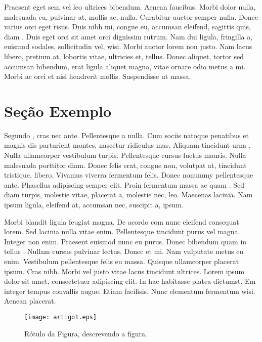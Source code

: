 Praesent eget sem vel leo ultrices bibendum. Aenean faucibus. Morbi dolor nulla, malesuada eu, pulvinar at, mollis ac, nulla. Curabitur auctor semper nulla. Donec varius orci eget risus. Duis nibh mi, congue eu, accumsan eleifend, sagittis quis, diam \citep{Justel2014}. Duis eget orci sit amet orci dignissim rutrum. Nam dui ligula, fringilla a, euismod sodales, sollicitudin vel, wisi. Morbi auctor lorem non justo. Nam lacus libero, pretium at, lobortis vitae, ultricies et, tellus. Donec aliquet, tortor sed accumsan bibendum, erat ligula aliquet magna, vitae ornare odio metus a mi. Morbi ac orci et nisl hendrerit mollis. Suspendisse ut massa.

\section{Seção Exemplo}
Segundo \citet{Goldschmidt2005}, cras nec ante. Pellentesque a nulla. Cum sociis natoque penatibus et magnis dis parturient montes, nascetur ridiculus mus. Aliquam tincidunt urna \citep{Rakocevic2014}. Nulla ullamcorper vestibulum turpis. Pellentesque cursus luctus mauris. Nulla malesuada porttitor diam. Donec felis erat, congue non, volutpat at, tincidunt tristique, libero. Vivamus viverra fermentum felis. Donec nonummy pellentesque ante. Phasellus adipiscing semper elit. Proin fermentum massa ac quam \citep{Lara2014}. Sed diam turpis, molestie vitae, placerat a, molestie nec, leo. Maecenas lacinia. Nam ipsum ligula, eleifend at, accumsan nec, suscipit a, ipsum.

Morbi blandit ligula feugiat magna. De acordo com  \citet{Soares2013} nunc eleifend consequat lorem. Sed lacinia nulla vitae enim. Pellentesque tincidunt purus vel magna. Integer non enim. Praesent euismod nunc eu purus. Donec bibendum quam in tellus \citep{Yoko2003}. Nullam cursus pulvinar lectus. Donec et mi. Nam vulputate metus eu enim. Vestibulum pellentesque felis eu massa. Quisque ullamcorper placerat ipsum. Cras nibh. Morbi vel justo vitae lacus tincidunt ultrices. Lorem ipsum dolor sit amet, consectetuer adipiscing elit. In hac habitasse platea dictumst. Em \citet{Dias2013} integer tempus convallis augue. Etiam facilisis. Nunc elementum fermentum wisi. Aenean placerat.

\begin{figure}[!ht]
	\centering
	\texttt{[image: artigo1.eps]}   
	\caption{Rótulo da Figura, descrevendo a figura.}
	\label{fig:figura0}
\end{figure}

